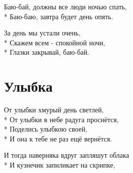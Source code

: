 \medskip

\begin{minipage}{\linewidth}
Баю-бай, должны все люди ночью спать,\\*
Баю-баю, завтра будет день опять.\\
\end{minipage}\par\medskip\nobreak

\medskip

\begin{minipage}{\linewidth}
\hspace*{1.5em}За день мы устали очень,\\*
\hspace*{1.5em}Скажем всем - спокойной ночи,\\*
\hspace*{1.5em}Глазки закрывай, баю-бай.\\
\end{minipage}

\vspace{\fill}\newpage

\section{Улыбка}
\label{song:Улыбка}

\medskip

\begin{minipage}{\linewidth}
От улыбки хмурый день светлей,\\*
От улыбки в небе радуга проснётся,\\*
Поделись улыбкою своей,\\*
И она к тебе не раз ещё вернётся.\\
\end{minipage}\par\medskip\nobreak

\medskip

\begin{minipage}{\linewidth}
\hspace*{1.5em}И тогда наверняка вдруг запляшут облака\\*
\hspace*{1.5em}И кузнечик запиликает на скрипке,\\
\end{minipage}\par\medskip\nobreak

